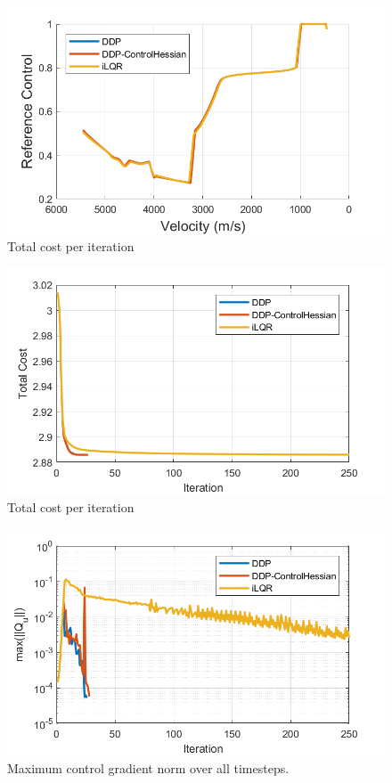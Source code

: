 \begin{figure}[h!]
	\centering
	\includegraphics[width=1\textwidth]{Images/Convergence/ControlProfiles}
	\caption{Total cost per iteration}
	\label{Fig:ConvergeControls}
\end{figure}
\begin{figure}[h!]
	\centering
	\includegraphics[width=1\textwidth]{Images/Convergence/cost}
	\caption{Total cost per iteration}
	\label{Fig:ConvergeCost}
\end{figure}
\begin{figure}[h!]
	\centering
	\includegraphics[width=1\textwidth]{Images/Convergence/grad_norm}
	\caption{Maximum control gradient norm over all timesteps.}
	\label{Fig:ConvergeGradient}
\end{figure}
